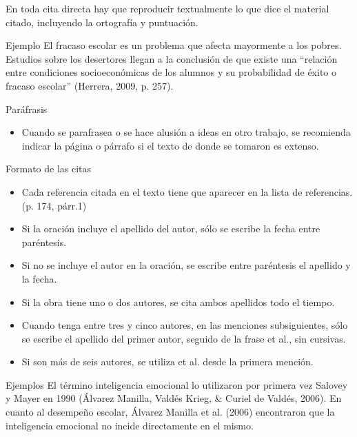 En toda cita directa hay que reproducir textualmente lo que dice el material citado, incluyendo la ortografía y puntuación.

Ejemplo
El fracaso escolar es un problema que afecta mayormente a los pobres. Estudios sobre los desertores llegan a la conclusión de que existe una “relación entre condiciones socioeconómicas de los alumnos y su probabilidad de éxito o fracaso escolar” (Herrera, 2009, p. 257).

Paráfrasis
\begin{itemize}
    \item Cuando se parafrasea o se hace alusión a ideas en otro trabajo, se recomienda indicar la página o párrafo si el texto de donde se tomaron es extenso.
\end{itemize}

Formato de las citas
\begin{itemize}
    \item Cada referencia citada en el texto tiene que aparecer en la lista de referencias. (p. 174, párr.1)
    \item Si la oración incluye el apellido del autor, sólo se escribe la fecha entre paréntesis.
    \item Si no se incluye el autor en la oración, se escribe entre paréntesis el apellido y la fecha.
    \item Si la obra tiene uno o dos autores, se cita ambos apellidos todo el tiempo.
    \item Cuando tenga entre tres y cinco autores, en las menciones subsiguientes, sólo se escribe el apellido del primer autor, seguido de la frase et al., sin cursivas.
    \item Si son más de seis autores, se utiliza et al. desde la primera mención.
\end{itemize}

Ejemplos
El término inteligencia emocional lo utilizaron por primera vez Salovey y Mayer en 1990 (Álvarez Manilla, Valdés Krieg, \& Curiel de Valdés, 2006).
En cuanto al desempeño escolar, Álvarez Manilla et al. (2006) encontraron que la inteligencia emocional no incide directamente en el mismo.